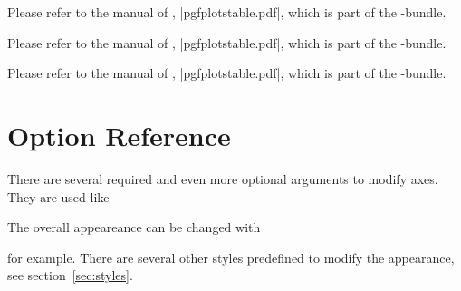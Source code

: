 \begin{command}{\pgfplotstableread{}}
	Please refer to the manual of \PGFPlotstable, |pgfplotstable.pdf|, which is part of the \PGFPlots-bundle.
\end{command}
\begin{command}{\pgfplotstabletypeset{}}
	Please refer to the manual of \PGFPlotstable, |pgfplotstable.pdf|, which is part of the \PGFPlots-bundle.
\end{command}
\begin{command}{\pgfplotstabletypesetfile{}}
	Please refer to the manual of \PGFPlotstable, |pgfplotstable.pdf|, which is part of the \PGFPlots-bundle.
\end{command}

\section{Option Reference}
There are several required and even more optional arguments to modify axes. They are used like
\begin{codeexample}
\end{codeexample}
\noindent
The overall appeareance can be changed with
\begin{codeexample}
\end{codeexample}
\noindent
for example. There are several other styles predefined to modify the appearance, see section~\ref{sec:styles}.

